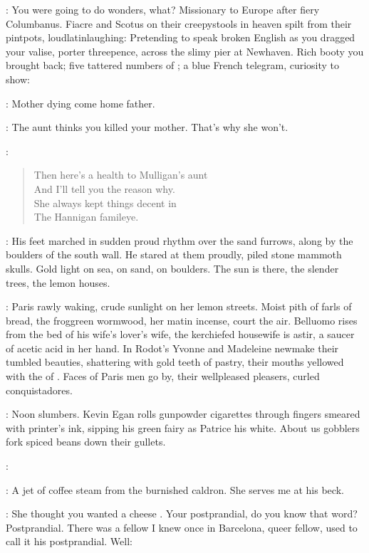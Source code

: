 \StephenInt:
You were going to do wonders, what?
Missionary to Europe after fiery Columbanus.
Fiacre and Scotus on their creepystools in heaven
spilt from their pintpots, loudlatinlaughing:
Pretending to speak broken English
as you dragged your valise, porter threepence,
across the slimy pier at Newhaven.
Rich booty you brought back;
five tattered numbers of ;
a blue French telegram, curiosity to show:

\simon:
Mother dying come home father.

\buck:
The aunt thinks you killed your mother.
That's why she won't.

:
\begin{verse}
    Then here's a health to Mulligan's aunt \\
    And I'll tell you the reason why. \\
    She always kept things decent in \\
    The Hannigan famileye.
\end{verse}

:
His feet marched in sudden proud rhythm over the sand furrows,
along by the boulders of the south wall.
He stared at them proudly,
piled stone mammoth skulls.
Gold light on sea, on sand, on boulders.
The sun is there, the slender trees, the lemon houses.

:
Paris rawly waking, crude sunlight on her lemon streets.
Moist pith of farls of bread,
the froggreen wormwood,
her matin incense,
court the air.
Belluomo rises from the bed of his wife's lover's wife,
the kerchiefed housewife is astir,
a saucer of acetic acid in her hand.
In Rodot's
Yvonne and Madeleine newmake their tumbled beauties,
shattering with gold teeth  of pastry,
their mouths yellowed with the  of .
Faces of Paris men go by, their wellpleased pleasers,
curled conquistadores.

\StephenInt:
Noon slumbers.
Kevin Egan rolls gunpowder cigarettes
through fingers smeared with printer's ink,
sipping his green fairy
as Patrice his white.
About us gobblers fork spiced beans down their gullets.

\kevin:

\StephenInt:
A jet of coffee steam from the burnished caldron.
She serves me at his beck.

\kevin:
She thought you wanted a cheese .
Your postprandial, do you know that word?
Postprandial.
There was a fellow I knew once in Barcelona, queer fellow,
used to call it his postprandial.
Well:

